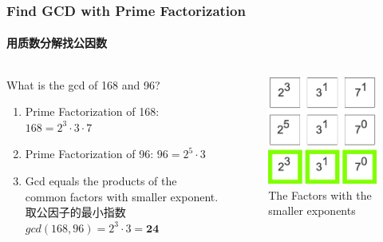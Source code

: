 \documentclass[
	11pt, %
]{beamer}
\begin{document}
\begin{frame}	
\frametitle{Find GCD with Prime Factorization}
\framesubtitle{用质数分解找公因数}
	\begin{columns}[t] %
		\begin{column}{0.45\textwidth} %
			What is the gcd of 168 and 96?
		 \begin{enumerate}
		 	\item Prime Factorization of 168: $168=2^3 \cdot 3 \cdot 7$
		 	\item Prime Factorization of 96: $96=2^5 \cdot 3$
		 	\item Gcd equals the products of the common factors with smaller exponent.\\ 取公因子的最小指数 \\ $gcd(168, 96) = 2^3 \cdot 3 = \textbf{24}$
		 	\end{enumerate}

		\end{column}
		\begin{column}{0.5\textwidth} %
		\begin{figure}
		\includegraphics[width=0.8\linewidth]{GCD.png}
		\caption{The Factors with the smaller exponents}
	\end{figure}
		
		\end{column}
	\end{columns}
\end{frame}
\end{document}
